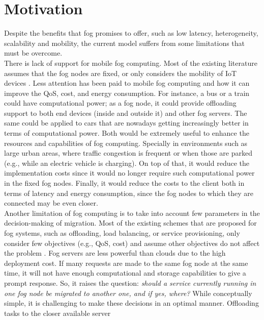 \section{Motivation}\label{subsec:Motivation}
Despite the benefits that fog promises to offer, such as low latency, heterogeneity, scalability and mobility, the current model suffers from some limitations that must be overcome.\\
\noindent\tab There is lack of support for mobile fog computing. Most of the existing literature assumes that the fog nodes are fixed, or only considers the mobility of IoT devices \cite{yousefpour2018all}. Less attention has been paid to mobile fog computing and how it can improve the QoS, cost, and energy consumption. For instance, a bus or a train could have computational power; as a fog node, it could provide offloading support to both end devices (inside and outside it) and other fog servers. The same could be applied to cars that are nowadays getting increasingly better in terms of computational power. Both would be extremely useful to enhance the resources and capabilities of fog computing. Specially in environments such as large urban areas, where traffic congestion is frequent or when those are parked (e.g., while an electric vehicle is charging). On top of that, it would reduce the implementation costs since it would no longer require such computational power in the fixed fog nodes. Finally, it would reduce the costs to the client both in terms of latency and energy consumption, since the fog nodes to which they are connected may be even closer.\\
\noindent\tab Another limitation of fog computing is to take into account few parameters in the decision-making of migration. Most of the existing schemes that are proposed for fog systems, such as offloading, load balancing, or service provisioning, only consider few objectives (e.g., QoS, cost) and assume other objectives do not affect the problem \cite{yousefpour2018all}. Fog servers are less powerful than clouds due to the high deployment cost. If many requests are made to the same fog node at the same time, it will not have enough computational and storage capabilities to give a prompt response. So, it raises the question: \textit{should a service currently running in one fog node be migrated to another one, and if yes, where?} While conceptually simple, it is challenging to make these decisions in an optimal manner. Offloading tasks to the closer available server
